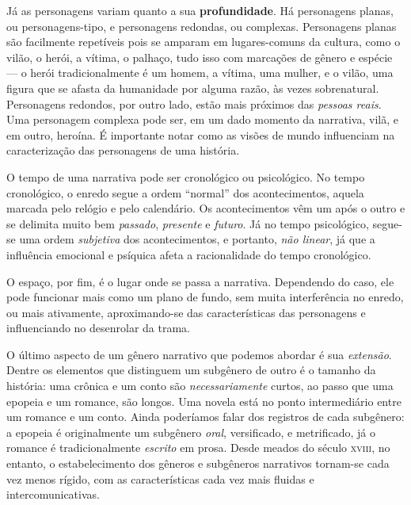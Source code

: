 \documentclass[11pt]{extarticle}
\begin{document}
Já as personagens variam quanto a sua \textbf{profundidade}. Há personagens planas, ou personagens-tipo, e personagens redondas, ou complexas. Personagens planas são facilmente repetíveis pois se amparam em lugares-comuns da cultura, como o vilão, o herói, a vítima, o palhaço, tudo isso com marcações de gênero e espécie --- o herói tradicionalmente é um homem, a vítima, uma mulher, e o vilão, uma figura que se afasta da humanidade por alguma razão, às vezes sobrenatural. Personagens redondos, por outro lado, estão mais próximos das \textit{pessoas reais}. Uma personagem complexa pode ser, em um dado momento da narrativa, vilã, e em outro, heroína. É importante notar como as visões de mundo influenciam na caracterização das personagens de uma história.

O tempo de uma narrativa pode ser cronológico ou psicológico. No tempo cronológico, o enredo segue a ordem ``normal'' dos acontecimentos, aquela marcada pelo relógio e pelo calendário. Os acontecimentos vêm um após o outro e se delimita muito bem \textit{passado}, \textit{presente} e \textit{futuro}. Já no tempo psicológico, segue-se uma ordem \textit{subjetiva} dos acontecimentos, e portanto, \textit{não linear}, já que a influência emocional e psíquica afeta a racionalidade do tempo cronológico. 

O espaço, por fim, é o lugar onde se passa a narrativa. Dependendo do caso, ele pode funcionar mais como um plano de fundo, sem muita interferência no enredo, ou mais ativamente, aproximando-se das características das personagens e influenciando no desenrolar da trama. 


O último aspecto de um gênero narrativo que podemos abordar é sua \textit{extensão}. Dentre os elementos que distinguem um subgênero de outro é o tamanho da história: uma crônica e um conto são \textit{necessariamente} curtos, ao passo que uma epopeia e um romance, são longos. Uma novela está no ponto intermediário entre um romance e um conto. Ainda poderíamos falar dos registros de cada subgênero: a epopeia é originalmente um subgênero \textit{oral}, versificado, e metrificado, já o romance é tradicionalmente \textit{escrito} em prosa.  Desde meados do século \textsc{xviii}, no entanto, o estabelecimento dos gêneros e subgêneros narrativos tornam-se cada vez menos rígido, com as características cada vez mais fluidas e intercomunicativas.
\end{document}
